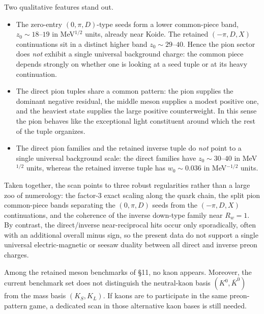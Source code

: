 \documentclass[11pt]{article}
\begin{document}
Two qualitative features stand out.
\begin{itemize}
  \item The zero-entry $(0,\pi,D)$-type seeds form a lower common-piece band,
    $z_0 \sim 18$--$19$ in MeV$^{1/2}$ units, already near Koide.
    The retained $(-\pi,D,X)$ continuations sit in a distinct higher band
    $z_0 \sim 29$--$40$.  Hence the pion sector does \emph{not} exhibit a
    single universal background charge: the common piece depends strongly on
    whether one is looking at a seed tuple or at its heavy continuation.
  \item The direct pion tuples share a common pattern: the pion supplies the
    dominant negative residual, the middle meson supplies a modest positive
    one, and the heaviest state supplies the large positive counterweight.
    In this sense the pion behaves like the exceptional light constituent
    around which the rest of the tuple organizes.
  \item The direct pion families and the retained inverse tuple do \emph{not}
    point to a single universal background scale: the direct families have
    $z_0 \sim 30$--$40$ in MeV$^{1/2}$ units, whereas the retained inverse
    tuple has $w_0 \sim 0.036$ in MeV$^{-1/2}$ units.
\end{itemize}

Taken together, the scan points to three robust regularities rather than a
large zoo of numerology: the factor-$3$ exact scaling along the quark chain,
the split pion common-piece bands separating the $(0,\pi,D)$ seeds from the
$(-\pi,D,X)$ continuations, and the coherence of the inverse down-type
family near $R_w=1$.  By contrast, the direct/inverse near-reciprocal hits
occur only sporadically, often with an additional overall minus sign, so the
present data do not support a single universal electric-magnetic or seesaw
duality between all direct and inverse preon charges.

Among the retained meson benchmarks of \S11, no kaon appears.
Moreover, the current benchmark set does not distinguish the neutral-kaon
basis $(K^0,\bar K^0)$ from the mass basis $(K_S,K_L)$.
If kaons are to participate in the same preon-pattern game, a dedicated
scan in those alternative kaon bases is still needed.
\end{document}
